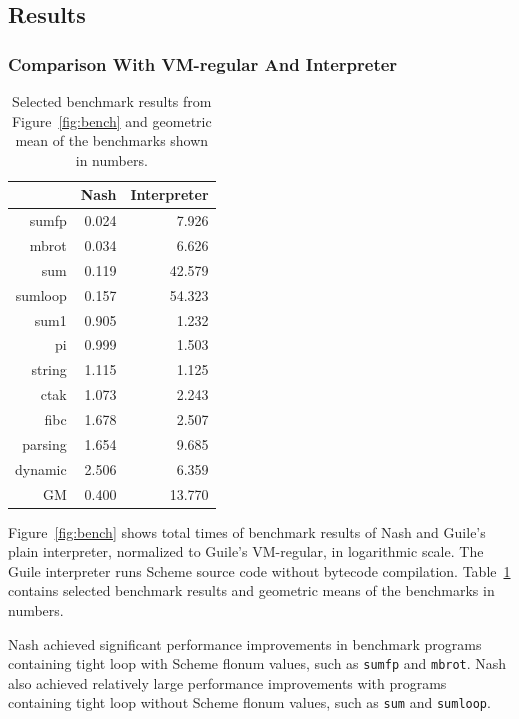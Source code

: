 \documentclass[preprint, 10pt]{sigplanconf}
\begin{document}
\subsection{Results}
\label{sec:results}

\subsubsection{Comparison With VM-regular And Interpreter}
\label{sec:guilecomp}

\begin{table}
  \centering
  \begin{tabular}{rrr}
     & Nash & Interpreter \\
    \toprule
    sumfp & 0.024 & 7.926 \\
    mbrot & 0.034 & 6.626 \\
    sum & 0.119 & 42.579 \\
    sumloop & 0.157 & 54.323 \\
    \midrule
    sum1 & 0.905 & 1.232 \\
    pi & 0.999 & 1.503 \\
    string & 1.115 & 1.125 \\
    \midrule
    ctak & 1.073 & 2.243 \\
    fibc & 1.678 & 2.507 \\
    parsing & 1.654 & 9.685 \\
    dynamic & 2.506 & 6.359 \\
    \midrule
    GM & 0.400 & 13.770 \\
  \end{tabular}
  \caption{Selected benchmark results from
    Figure~\hyperref[fig:bench]{\ref{fig:bench}} and geometric mean of the
    benchmarks shown in numbers.}
\label{tab:compguile}
\end{table}

Figure~\ref{fig:bench} shows total times of benchmark results of Nash and
Guile's plain interpreter, normalized to Guile's VM-regular, in logarithmic
scale.  The Guile interpreter runs Scheme source code without bytecode
compilation.  Table~\hyperref[tab:compguile]{\ref{tab:compguile}} contains
selected benchmark results and geometric means of the benchmarks in numbers.

Nash achieved significant performance improvements in benchmark programs
containing tight loop with Scheme flonum values, such as \texttt{sumfp} and
\texttt{mbrot}.  Nash also achieved relatively large performance improvements
with programs containing tight loop without Scheme flonum values, such as
\texttt{sum} and \texttt{sumloop}.
\end{document}
